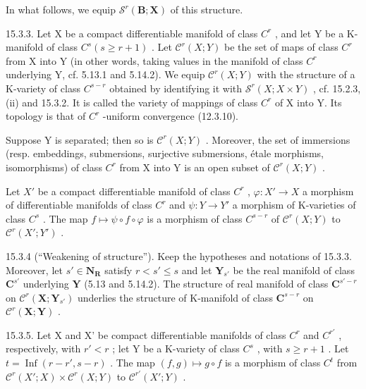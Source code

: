 In what follows, we equip \(\mathcal{S}^{r}(\mathbf{B};\mathbf{X})\) of this structure.

15.3.3. Let X be a compact differentiable manifold of class \(C^{r}\) , and let Y be a K-manifold of class \(C^{s}(s \geqslant r + 1)\) . Let \(\mathcal{C}^{r}(X; Y)\) be the set of maps of class \(C^{r}\) from X into Y (in other words, taking values in the manifold of class \(C^{r}\) underlying Y, cf. 5.13.1 and 5.14.2). We equip \(\mathcal{C}^{r}(X; Y)\) with the structure of a K-variety of class \(C^{s-r}\) obtained by identifying it with \(\mathcal{S}^{r}(X; X \times Y)\) , cf. 15.2.3, (ii) and 15.3.2. It is called the variety of mappings of class \(C^{r}\) of X into Y. Its topology is that of \(C^{r}\) -uniform convergence (12.3.10).

Suppose Y is separated; then so is \(\mathcal{C}^{r}(X;Y)\) . Moreover, the set of immersions (resp. embeddings, submersions, surjective submersions, étale morphisms, isomorphisms) of class \(C^{r}\) from X into Y is an open subset of \(\mathcal{C}^{r}(X;Y)\) .

Let \(X'\) be a compact differentiable manifold of class \(C^r\) , \(\varphi: X' \to X\) a morphism of differentiable manifolds of class \(C^r\) and \(\psi: Y \to Y'\) a morphism of K-varieties of class \(C^s\) . The map \(f \mapsto \psi \circ f \circ \varphi\) is a morphism of class \(C^{s-r}\) of \(\mathscr{C}^r(X; Y)\) to \(\mathscr{C}^r(X'; Y')\) .

15.3.4 (“Weakening of structure”). Keep the hypotheses and notations of 15.3.3. Moreover, let \(s' \in \mathbf{N}_{\mathbf{R}}\) satisfy \(r < s' \leqslant s\) and let \(\mathbf{Y}_{s'}\) be the real manifold of class \(\mathbf{C}^{s'}\) underlying \(\mathbf{Y}\) (5.13 and 5.14.2). The structure of real manifold of class \(\mathbf{C}^{s'-r}\) on \(\mathcal{C}^r(\mathbf{X}; \mathbf{Y}_{s'})\) underlies the structure of K-manifold of class \(\mathbf{C}^{s-r}\) on \(\mathcal{C}^r(\mathbf{X}; \mathbf{Y})\) .

15.3.5. Let X and X' be compact differentiable manifolds of class \(C^{r}\) and \(C^{r'}\) , respectively, with \(r' < r\) ; let Y be a K-variety of class \(C^{s}\) , with \(s \geqslant r + 1\) . Let \(t = \operatorname{Inf}(r - r', s - r)\) . The map \((f, g) \mapsto g \circ f\) is a morphism of class \(C^{t}\) from \(\mathcal{C}^{r}(X'; X) \times \mathcal{C}^{r}(X; Y)\) to \(\mathcal{C}^{r'}(X'; Y)\) .

